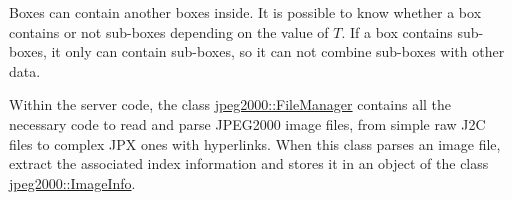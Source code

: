 Boxes can contain another boxes inside. It is possible to know
whether a box contains or not sub-boxes depending on the value of
$T$. If a box contains sub-boxes, it only can contain sub-boxes, 
so it can not combine sub-boxes with other data.

Within the server code, the class \hyperlink{classjpeg2000_1_1FileManager}
{jpeg2000::FileManager} contains all the necessary code to read and parse
JPEG2000 image files, from simple raw J2C files to complex JPX ones with
hyperlinks. When this class parses an image file, extract the associated
index information and stores it in an object of the class
\hyperlink{classjpeg2000_1_1ImageInfo}{jpeg2000::ImageInfo}.
           
